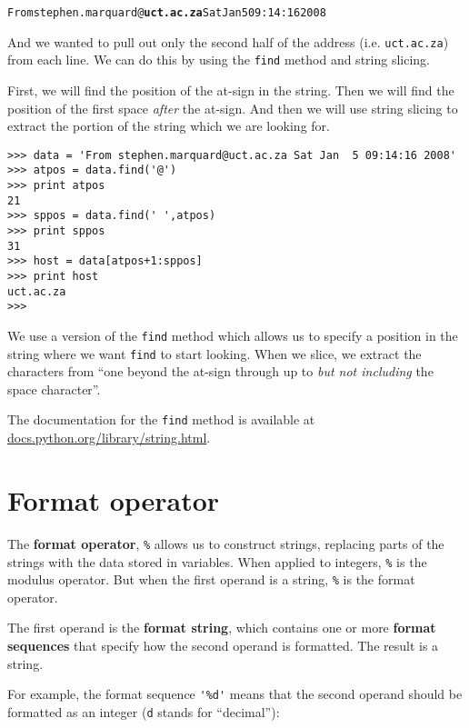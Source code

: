 \beforeverb
\begin{alltt}
From stephen.marquard@{\bf uct.ac.za} Sat Jan  5 09:14:16 2008
\end{alltt}
\afterverb

And we wanted to pull out only the second half of the address (i.e.
{\tt uct.ac.za}) from each line.  We can do this by using the {\tt find}
method and string slicing.   

First, we will find the position of the at-sign in the string.  Then we will
find the position of the first space \emph{after} the at-sign.  And then we
will use string slicing to extract the portion of the string which we 
are looking for.

\beforeverb
\begin{verbatim}
>>> data = 'From stephen.marquard@uct.ac.za Sat Jan  5 09:14:16 2008'
>>> atpos = data.find('@')
>>> print atpos
21
>>> sppos = data.find(' ',atpos)
>>> print sppos
31
>>> host = data[atpos+1:sppos]
>>> print host
uct.ac.za
>>> 
\end{verbatim}
\afterverb
%
We use a version of the {\tt find} method which allows us to specify
a position in the string where we want {\tt find} to start looking.
When we slice, we extract the characters 
from ``one beyond the at-sign through up to \emph{but not including} the 
space character''.  

The documentation for the {\tt find} method is available at
\url{docs.python.org/library/string.html}.

\section{Format operator}


The {\bf format operator}, {\tt \%}
allows us to construct strings, replacing parts of the strings
with the data stored in variables.
When applied to integers, {\tt \%} is the modulus operator.  But
when the first operand is a string, {\tt \%} is the format operator.


The first operand is the {\bf format string}, which contains
one or more {\bf format sequences} that
specify how
the second operand is formatted.  The result is a string.


For example, the format sequence \verb"'%d'" means that
the second operand should be formatted as an
integer ({\tt d} stands for ``decimal''):

